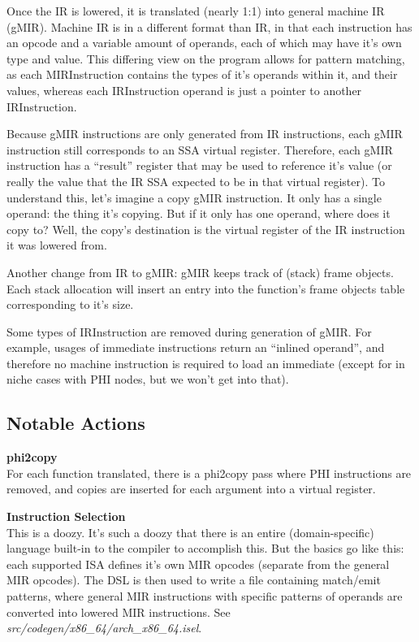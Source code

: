 \documentclass[12pt]{article}
\begin{document}
Once the IR is lowered, it is translated (nearly 1:1) into general machine IR (gMIR). Machine IR is in a different format than IR, in that each instruction has an opcode and a variable amount of operands, each of which may have it's own type and value. This differing view on the program allows for pattern matching, as each MIRInstruction contains the types of it's operands within it, and their values, whereas each IRInstruction operand is just a pointer to another IRInstruction.

Because gMIR instructions are only generated from IR instructions, each gMIR instruction still corresponds to an SSA virtual register. Therefore, each gMIR instruction has a ``result'' register that may be used to reference it's value (or really the value that the IR SSA expected to be in that virtual register). To understand this, let's imagine a copy gMIR instruction. It only has a single operand: the thing it's copying. But if it only has one operand, where does it copy to? Well, the copy's destination is the virtual register of the IR instruction it was lowered from.

Another change from IR to gMIR: gMIR keeps track of (stack) frame objects. Each stack allocation will insert an entry into the function's frame objects table corresponding to it's size.

Some types of IRInstruction are removed during generation of gMIR. For example, usages of immediate instructions return an ``inlined operand'', and therefore no machine instruction is required to load an immediate (except for in niche cases with PHI nodes, but we won't get into that).


\subsection{Notable Actions}
\label{subsec:general-machine-ir:notable-actions}

\noindent\textbf{phi2copy}\\
\indent For each function translated, there is a phi2copy pass where PHI instructions are removed, and copies are inserted for each argument into a virtual register.

\noindent\textbf{Instruction Selection}\\
\indent This is a doozy. It's such a doozy that there is an entire (domain-specific) language built-in to the compiler to accomplish this. But the basics go like this: each supported ISA defines it's own MIR opcodes (separate from the general MIR opcodes). The DSL is then used to write a file containing match/emit patterns, where general MIR instructions with specific patterns of operands are converted into lowered MIR instructions. See \emph{src/codegen/x86\_64/arch\_x86\_64.isel}.
\end{document}
